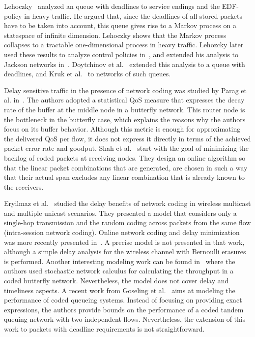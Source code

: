 \documentclass[preprint,12pt]{elsarticle}
\theoremstyle{definition}
\theoremstyle{plain}
\theoremstyle{remark}
\begin{document}
Lehoczky~\cite{Lehoczky_mm1} analyzed an  queue with deadlines to service endings and the EDF-policy in heavy traffic. He argued that, since the deadlines of all stored packets have to be taken into account, this queue gives rise to a Markov process on a statespace of infinite dimension. Lehoczky shows that the Markov process collapses to a tractable one-dimensional process in heavy traffic. Lehozcky later used these results to analyze control policies in~\cite{Lehoczky_control}, and extended his analysis to Jackson networks in~\cite{Lehoczky_jackson}. Doytchinov et al.~\cite{doytchinov_edf_heavy_traffic} extended this analysis to a  queue with deadlines, and Kruk et al.~\cite{kruk_edf_heavy_traffic_networks} to networks of such queues.

Delay sensitive traffic in the presence of network coding was studied by Parag et al. in~\cite{parag08}. The authors adopted a statistical QoS measure that expresses the decay rate of the buffer at the middle node in a butterfly network. This router node is the bottleneck in the butterfly case, which explains the reasons why the authors focus on its buffer behavior. Although this metric is enough for approximating the delivered QoS per flow, it does not express it directly in terms of the achieved packet error rate and goodput. Shah et al.~\cite{shah07} start with the goal of minimizing the backlog of coded packets at receiving nodes. They design an online algorithm so that the linear packet combinations that are generated, are chosen in such a way that their actual span excludes any linear combination that is already known to the receivers.

Eryilmaz et al.~\cite{eryilmaz06} studied the delay benefits of network coding in wireless multicast and multiple unicast scenarios. They presented a model that considers only a single-hop transmission and the random coding across packets from the same flow (intra-session network coding). Online network coding and delay minimization was more recently presented in~\cite{barros09a}. A precise model is not presented in that work, although a simple delay analysis for the wireless channel with Bernoulli erasures is performed. Another interesting modeling work can be found in~\cite{wu09} where the authors used stochastic network calculus for calculating the throughput in a coded butterfly network. Nevertheless, the model does not cover delay and timeliness aspects. A recent work from Goseling et al.~\cite{goseling09} aims at modeling the performance of coded queueing systems. Instead of focusing on providing exact expressions, the authors provide bounds on the performance of a coded tandem queuing network with two independent flows. Nevertheless, the extension of this work to packets with deadline requirements is not straightforward.
\end{document}
